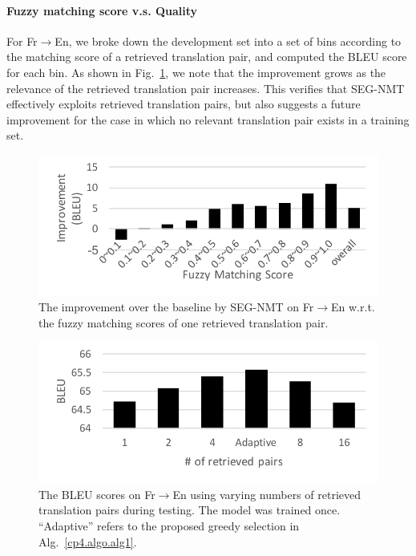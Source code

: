\paragraph{Fuzzy matching score v.s. Quality}
For Fr$\to$En, we broke down the development set into a set of bins according to the matching score of a retrieved translation pair, and computed the BLEU score for each bin. As shown in Fig.~\ref{cp4.fig.fuzzy_improv}, we note that the improvement grows as the relevance of the retrieved translation pair increases. This verifies that SEG-NMT effectively exploits retrieved translation pairs, but also suggests a future improvement for the case in which no relevant translation pair exists in a training set. 
\begin{figure}
\centering
\includegraphics[width=\linewidth,clip=True,trim=0 15 0 30]{figs/seg/fuzzy_improv.pdf}
\caption{
\label{cp4.fig.fuzzy_improv}
The improvement over the baseline by SEG-NMT on Fr$\to$En w.r.t. the fuzzy matching scores of one retrieved translation pair. 
}
\end{figure}
\begin{figure}
\centering
\includegraphics[width=\linewidth,clip=True,trim=0 5 0 20]{figs/seg/bleu_retrieved.pdf}
\caption{
\label{cp4.fig.bleu_retrieved}
The BLEU scores on Fr$\to$En using varying numbers of retrieved translation pairs during testing. The model was trained once. ``Adaptive'' refers to the proposed greedy selection in Alg.~\ref{cp4.algo.alg1}.
}
\end{figure}

